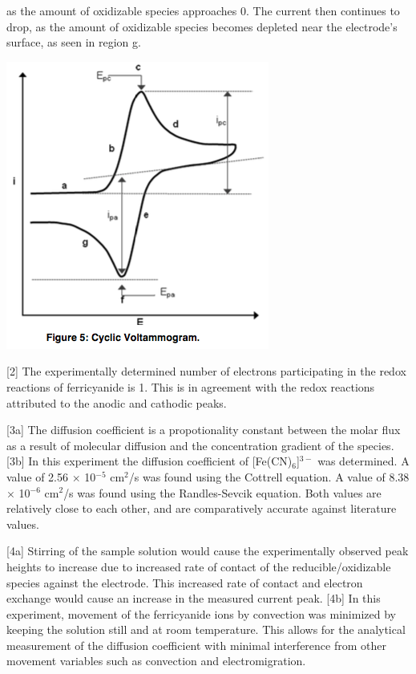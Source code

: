 \documentclass{article}
\begin{document}
\begin{multicols}{2}
{as the amount of oxidizable species approaches 0. 
The current then continues to drop, as the amount of oxidizable species becomes
depleted near the electrode's surface, as seen in region g.
\begin{center}
    \includegraphics[scale=0.4]{CV_dis}
    \label{fig:CV_dis}
\end{center}

[2] The experimentally determined number of electrons participating in the
redox reactions of ferricyanide is 1. This is in agreement with the redox reactions
attributed to the anodic and cathodic peaks.

[3a] The diffusion coefficient is a propotionality constant between the molar
flux as a result of molecular diffusion and the concentration gradient of the
species. [3b] In this experiment the diffusion coefficient of
[Fe(CN)$_6$]$^{3-}$ was determined. 
A value of 2.56 $\times$ 10$^{-5}$ cm$^2$/s was found using the Cottrell
equation.
A value of 8.38 $\times$ 10$^{-6}$ cm$^2$/s was found using the Randles-Sevcik
equation.
Both values are relatively close to each other, and are comparatively accurate
against literature values. \cite{trau}

[4a] Stirring of the sample solution would cause the experimentally observed
peak heights to increase due to increased rate of contact of the
reducible/oxidizable species against the electrode. This increased rate of
contact and electron exchange would cause an increase in the measured current
peak.  
[4b] In this experiment, movement of the ferricyanide ions by convection
was minimized by keeping the solution still and at room temperature. This
allows for the analytical measurement of the diffusion coefficient with minimal
interference from other movement variables such as convection and
electromigration.

}
\end{multicols}
\end{document}
